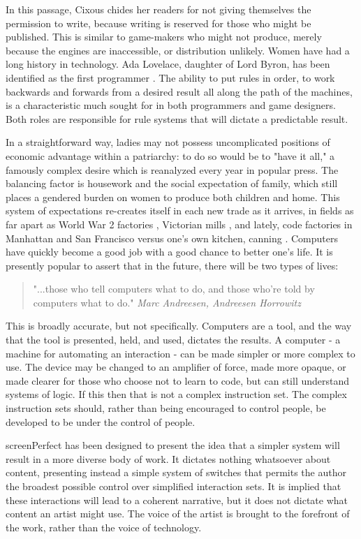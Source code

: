 In this passage, Cixous chides her readers for not giving themselves the permission to write, because writing is reserved for those who might be published. This is similar to game-makers who might not produce, merely because the engines are inaccessible, or distribution unlikely. Women have had a long history in technology.
Ada Lovelace, daughter of Lord Byron, has been identified as the first programmer \parencite{plant}. The ability to put rules in order, to work backwards and forwards from a desired result all along the path of the machines, is a characteristic much sought for in both programmers and game designers. Both roles are responsible for rule systems that will dictate a predictable result.

In a straightforward way, ladies may not possess uncomplicated positions of economic advantage within a patriarchy: to do so would be to "have it all," a famously complex desire which is reanalyzed every year in popular press. The balancing factor is housework and the social expectation of family, which still places a gendered burden on women to produce both children and home. This system of expectations re-creates itself in each new trade as it arrives, in fields as far apart as World War 2 factories \parencite{summerfield}, Victorian mills \parencite{baskerville}, and lately, code factories in Manhattan and San Francisco versus one's own kitchen, canning \parencite{newdomestic}. Computers have quickly become a good job with a good chance to better one's life. It is presently popular to assert that in the future, there will be two types of lives:

\begin{quote}
"...those who tell computers what to do, and those who're told by computers what to do."
\textit{Marc Andreesen, Andreesen Horrowitz}
\end{quote}

This is broadly accurate, but not specifically. Computers are a tool, and the way that the tool is presented, held, and used, dictates the results. A computer - a machine for automating an interaction - can be made simpler or more complex to use. The device may be changed to an amplifier of force, made more opaque, or made clearer for those who choose not to learn to code, but can still understand systems of logic. If this then that is not a complex instruction set. The complex instruction sets should, rather than being encouraged to control people, be developed to be under the control of people.

screenPerfect has been designed to present the idea that a simpler system will result in a more diverse body of work. It dictates nothing whatsoever about content, presenting instead a simple system of switches that permits the author the broadest possible control over simplified interaction sets. It is implied that these interactions will lead to a coherent narrative, but it does not dictate what content an artist might use. The voice of the artist is brought to the forefront of the work, rather than the voice of technology.


